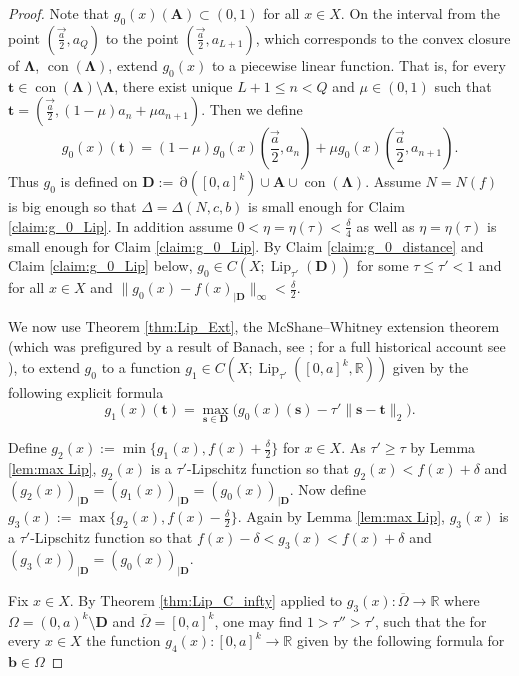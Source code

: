 \documentclass[11pt]{article}
\theoremstyle{plain}
\theoremstyle{definition}
\DeclareMathOperator{\Lip}{Lip}
\DeclareMathOperator{\Edge}{\partial}
\DeclareMathOperator{\con}{con}
\def\R{\mathbb{R}}
\def\tt{\mathbf t}
\def\ss{\mathbf s}
\def\AA{\mathbf A}
\def\DD{\mathbf D}
\def\LL{\mathbf \Lambda}
\def\bb{\mathbf b}
\numberwithin{figure}{section}
\begin{document}
\begin{proof}
  Note that $g_0(x)(\AA)\subset (0,1)$ for all $x\in X$. On the interval from the point $(\vec{\frac{a}{2}}, a_{Q})$ to the point  $(\vec{\frac{a}{2}}, a_{L+1})$,  which corresponds to the convex closure of $\LL$, $\con(\LL)$, extend $g_0(x)$ to a piecewise linear function. That is, for every $\tt\in\con(\LL)\setminus\LL$, there exist unique $L+1\leq n<Q$ and $\mu\in(0,1)$ such that  $\tt=(\vec{\frac{a}{2}},(1-\mu)a_n+\mu a_{n+1})$. Then we define
\begin{equation*}
    g_0(x)(\tt)=(1-\mu)g_0(x)(\vec{\frac{a}{2}},a_{n})+\mu g_0(x)(\vec{\frac{a}{2}},a_{n+1}).
\end{equation*}
 Thus $g_0$ is defined on $\DD:=\Edge([0,a]^k)\cup \mathbf{A}\cup \con(\LL)$. Assume $N=N(f)$ is  big enough so that  $\Delta=\Delta(N,c,b)$ is small enough for Claim \ref{claim:g_0_Lip}. In addition assume  $0<\eta=\eta(\tau)<\frac{\delta}{4}$ as well as $\eta=\eta(\tau)$ is small enough for Claim \ref{claim:g_0_Lip}. By Claim \ref{claim:g_0_distance} and Claim \ref{claim:g_0_Lip} below, $g_0\in C(X;\Lip_{\tau'}(\DD))$ for some $\tau\leq\tau'<1$ and for all $x\in X$ and $\|g_0(x)-f(x)_{|\DD}\|_\infty<\frac{\delta}{2}$.
     \item
     We now use Theorem \ref{thm:Lip_Ext}, the McShane--Whitney extension theorem (which was prefigured by a result of Banach, see \cite[Theorem IV.7.5]{Ban51}; for a full historical account see \cite{gutev2020lipschitz}),  to extend $g_0$ to a function $g_1\in C(X;\Lip_{\tau'}([0,a]^k,\R))$ given
          by the following explicit formula
     \begin{equation*}\label{notation_g1}
        g_1(x)(\tt)=\max\limits_{\mathbf s\in \DD}\big(g_0(x)(\ss)-\tau'\|\mathbf{s-t}\|_2\big).
    \end{equation*}
    \item
Define  $g_2(x):=\min\{g_1(x),f(x)+\frac{\delta}{2}\}$ for $x\in X$. As $\tau'\geq \tau$ by Lemma \ref{lem:max Lip}, $g_2(x)$ is a $\tau'$-Lipschitz function so that $g_2(x)< f(x)+\delta$ and  $(g_2(x))_{|\DD}=(g_1(x))_{|\DD}=(g_0(x))_{|\DD}$. 
Now define $g_3(x):=\max\{g_2(x),f(x)-\frac{\delta}{2}\}$. Again by Lemma \ref{lem:max Lip}, $g_3(x)$ is a $\tau'$-Lipschitz function so that $f(x)-\delta<g_3(x)<f(x)+\delta$ and  $(g_3(x))_{|\DD}=(g_0(x))_{|\DD}$. 
    \item
Fix $x\in X$. By Theorem \ref{thm:Lip_C_infty} applied to $g_3(x):\overline{\Omega}\rightarrow \R$ where $\Omega=(0,a)^k\setminus \DD$ and $\overline{\Omega}=[0,a]^k$, one may find  $1>\tau''>\tau'$, such that the for every $x\in X$ the function  $g_4(x):[0,a]^k\rightarrow \R$ given by the following formula for $\bb\in \Omega$

\end{proof}
\end{document}
